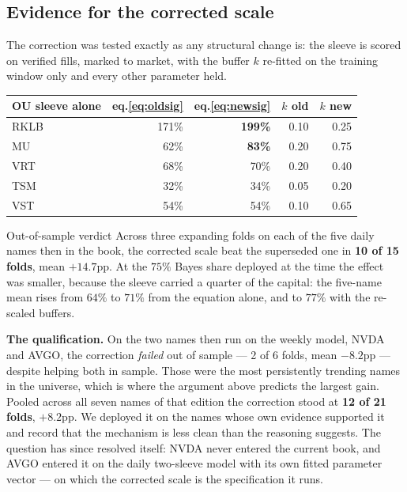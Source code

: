 \documentclass[11pt]{article}
\begin{document}
\subsection{Evidence for the corrected scale}\label{sec:sigmaev}

The correction was tested exactly as any structural change is: the sleeve is scored on verified
fills, marked to market, with the buffer $k$ re-fitted on the training window only and every
other parameter held.

\begin{table}[H]\centering\small
\begin{tabular}{lrrrr}
\toprule
\textbf{OU sleeve alone} & \textbf{eq.\eqref{eq:oldsig}} & \textbf{eq.\eqref{eq:newsig}} &
\textbf{$k$ old} & \textbf{$k$ new}\\
\midrule
RKLB & 171\% & \textbf{199\%} & 0.10 & 0.25\\
MU   & 62\%  & \textbf{83\%}  & 0.20 & 0.75\\
VRT  & 68\%  & 70\%           & 0.20 & 0.40\\
TSM  & 32\%  & 34\%           & 0.05 & 0.20\\
VST  & 54\%  & 54\%           & 0.10 & 0.65\\
\bottomrule
\end{tabular}
\end{table}

\begin{keybox}{Out-of-sample verdict}
Across three expanding folds on each of the five daily names then in the book, the corrected
scale beat the superseded one in \textbf{10 of 15 folds}, mean $+14.7$pp. At the $75\%$ Bayes
share deployed at the time the effect was smaller, because the sleeve carried a quarter of the
capital: the five-name mean rises from $64\%$ to $71\%$ from the equation alone, and to $77\%$
with the re-scaled buffers.

\textbf{The qualification.} On the two names then run on the weekly model, NVDA and AVGO, the
correction \emph{failed} out of sample --- 2 of 6 folds, mean $-8.2$pp --- despite helping both in
sample. Those were the most persistently trending names in the universe, which is where the
argument above predicts the largest gain. Pooled across all seven names of that edition the
correction stood at \textbf{12 of 21 folds}, $+8.2$pp. We deployed it on the names whose own
evidence supported it and record that the mechanism is less clean than the reasoning suggests.
The question has since resolved itself: NVDA never entered the current book, and AVGO entered it
on the daily two-sleeve model with its own fitted parameter vector --- on which the corrected
scale is the specification it runs.
\end{keybox}
\end{document}
